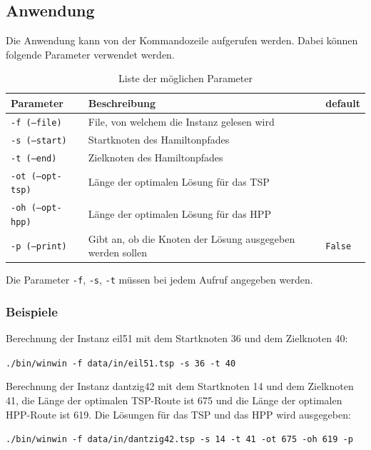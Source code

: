 \documentclass[11pt,a4paper]{article}
\begin{document}
\subsection{Anwendung}
Die Anwendung kann von der Kommandozeile aufgerufen werden. Dabei können folgende Parameter verwendet werden.

\begin{table}[H]
        \centering
        \begin{tabular}{| l | l | l |}
            \hline
            \textbf{Parameter}          & \textbf{Beschreibung}                                         & \textbf{default}      \\ \hline
            \texttt{-f (--file)}        & File, von welchem die Instanz gelesen wird                    &                       \\ \hline
            \texttt{-s (--start)}       & Startknoten des Hamiltonpfades                                &                       \\ \hline
            \texttt{-t (--end)}         & Zielknoten des Hamiltonpfades                                 &                       \\ \hline
            \texttt{-ot (--opt-tsp)}    & Länge der optimalen Lösung für das TSP                        &                       \\ \hline
            \texttt{-oh (--opt-hpp)}    & Länge der optimalen Lösung für das HPP                        &                       \\ \hline
            \texttt{-p (--print)}       & Gibt an, ob die Knoten der Lösung ausgegeben werden sollen    & \texttt{False}        \\ \hline
        \end{tabular}
        \caption{Liste der möglichen Parameter}
        \label{tab:parameter}
\end{table}

Die Parameter \texttt{-f}, \texttt{-s}, \texttt{-t} müssen bei jedem Aufruf angegeben werden.

\subsubsection{Beispiele}
Berechnung der Instanz eil51 mit dem Startknoten 36 und dem Zielknoten 40:
\begin{flushleft}
\texttt{./bin/winwin -f data/in/eil51.tsp -s 36 -t 40}
\end{flushleft}

Berechnung der Instanz dantzig42 mit dem Startknoten 14 und dem Zielknoten 41, die Länge der optimalen TSP-Route ist 675 und die Länge der optimalen HPP-Route ist 619. Die Lösungen für das TSP und das HPP wird ausgegeben:
\begin{flushleft}
\texttt{./bin/winwin -f data/in/dantzig42.tsp -s 14 -t 41 -ot 675 -oh 619 -p}
\end{flushleft}
\end{document}
